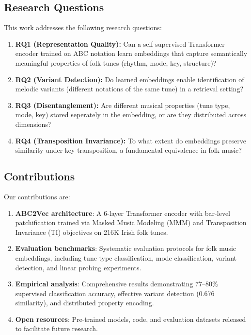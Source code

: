 \documentclass[]{interact}
\theoremstyle{plain}
\theoremstyle{definition}
\theoremstyle{remark}
\begin{document}
\subsection{Research Questions}

This work addresses the following research questions:

\begin{enumerate}
\item \textbf{RQ1 (Representation Quality):} Can a self-supervised Transformer encoder trained on ABC notation learn embeddings that capture semantically meaningful properties of folk tunes (rhythm, mode, key, structure)?
\item \textbf{RQ2 (Variant Detection):} Do learned embeddings enable identification of melodic variants (different notations of the same tune) in a retrieval setting?
\item \textbf{RQ3 (Disentanglement):} Are different musical properties (tune type, mode, key) stored seperately in the embedding, or are they distributed across dimensions?
\item \textbf{RQ4 (Transposition Invariance):} To what extent do embeddings preserve similarity under key transposition, a fundamental equivalence in folk music?
\end{enumerate}
    
\subsection{Contributions}

Our contributions are:

\begin{enumerate}
\item \textbf{ABC2Vec architecture}: A 6-layer Transformer encoder with bar-level patchification trained via Masked Music Modeling (MMM) and Transposition Invariance (TI) objectives on 216K Irish folk tunes.
\item \textbf{Evaluation benchmarks}: Systematic evaluation protocols for folk music embeddings, including tune type classification, mode classification, variant detection, and linear probing experiments.
\item \textbf{Empirical analysis}: Comprehensive results demonstrating 77--80\% supervised classification accuracy, effective variant detection (0.676 similarity), and distributed property encoding.
\item \textbf{Open resources}: Pre-trained models, code, and evaluation datasets released to facilitate future research.
\end{enumerate}
\end{document}
